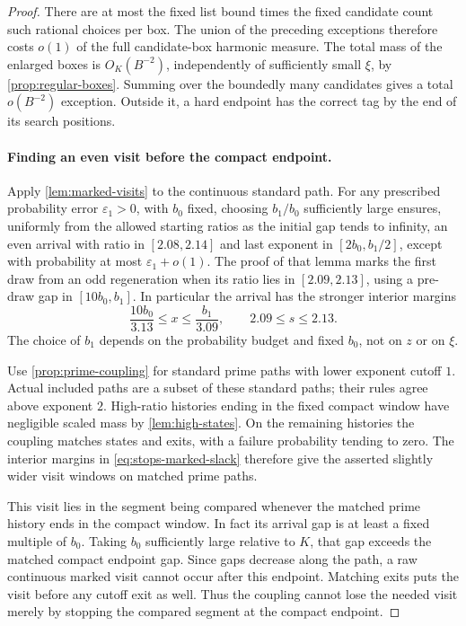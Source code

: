 \begin{proof}
There are at most the fixed list bound times the fixed candidate count
such rational choices per box.  The union of the preceding exceptions
therefore costs $o(1)$ of the full candidate-box harmonic measure.
The total mass of the enlarged boxes is $O_K(B^{-2})$, independently
of sufficiently small $\xi$, by \cref{prop:regular-boxes}.  Summing
over the boundedly many candidates gives a total $o(B^{-2})$
exception.  Outside it, a hard endpoint has the correct tag by the end
of its search positions.

\paragraph{Finding an even visit before the compact endpoint.}
Apply
\cref{lem:marked-visits} to the continuous standard path.  For any
prescribed probability error $\varepsilon_1>0$, with $b_0$ fixed,
choosing $b_1/b_0$ sufficiently large ensures, uniformly from the
allowed starting ratios as the initial gap tends to infinity, an even
arrival with ratio in $[2.08,2.14]$ and last exponent in
$[2b_0,b_1/2]$, except with probability at most
$\varepsilon_1+o(1)$.  The proof of that lemma marks the first draw
from an odd regeneration when its ratio lies in $[2.09,2.13]$, using
a pre-draw gap in $[10b_0,b_1]$.  In particular the arrival has the
stronger interior margins
\begin{equation}\label{eq:stops-marked-slack}
 \frac{10b_0}{3.13}\le x\le\frac{b_1}{3.09},
 \qquad 2.09\le s\le2.13.
\end{equation}
The choice of $b_1$ depends on the probability budget and fixed $b_0$,
not on $z$ or on $\xi$.

Use \cref{prop:prime-coupling} for standard prime paths with lower
exponent cutoff $1$.  Actual included paths are a subset of these
standard paths; their rules agree above exponent $2$.  High-ratio
histories ending in the fixed compact window have negligible scaled
mass by \cref{lem:high-states}.  On the remaining histories the
coupling matches states and exits, with a failure probability tending
to zero.  The interior margins in \eqref{eq:stops-marked-slack}
therefore give the asserted slightly wider visit windows on matched
prime paths.

This visit lies in the segment being compared whenever the matched
prime history ends in the compact window.  In fact its arrival gap is
at least a fixed multiple of $b_0$.  Taking $b_0$ sufficiently large
relative to $K$, that gap exceeds the matched compact endpoint gap.
Since gaps decrease along the path, a raw continuous marked visit
cannot occur after this endpoint.  Matching exits puts the visit
before any cutoff exit as well.  Thus the coupling cannot lose the
needed visit merely by stopping the compared segment at the compact
endpoint.


\end{proof}
